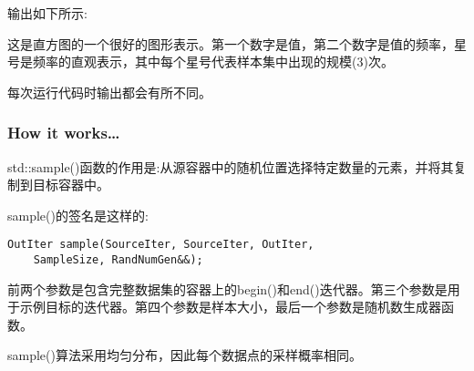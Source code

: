 \begin{itemize}
输出如下所示:


这是直方图的一个很好的图形表示。第一个数字是值，第二个数字是值的频率，星号是频率的直观表示，其中每个星号代表样本集中出现的规模(3)次。

每次运行代码时输出都会有所不同。
\end{itemize}

\subsubsection{How it works…}

std::sample()函数的作用是:从源容器中的随机位置选择特定数量的元素，并将其复制到目标容器中。

sample()的签名是这样的:

\begin{lstlisting}[style=styleCXX]
OutIter sample(SourceIter, SourceIter, OutIter,
	SampleSize, RandNumGen&&);
\end{lstlisting}

前两个参数是包含完整数据集的容器上的begin()和end()迭代器。第三个参数是用于示例目标的迭代器。第四个参数是样本大小，最后一个参数是随机数生成器函数。

sample()算法采用均匀分布，因此每个数据点的采样概率相同。
























